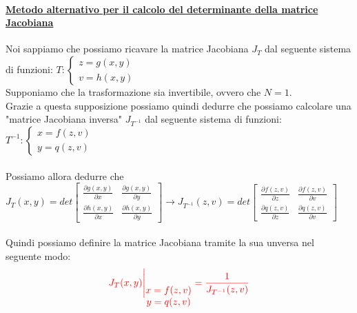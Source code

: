 \documentclass{article}
\begin{document}
\paragraph{\underline{Metodo alternativo per il calcolo del determinante della matrice Jacobiana}}
Noi sappiamo che possiamo ricavare la matrice Jacobiana $J_T$ dal seguente sistema di funzioni: $T:\begin{cases}
    z = g(x,y) \\
    v = h(x,y)
\end{cases}$ \\
Supponiamo che la trasformazione sia invertibile, ovvero che $N = 1$. \\
Grazie a questa supposizione possiamo quindi dedurre che possiamo calcolare una "matrice Jacobiana inversa" $J_{T^{-1}}$ dal seguente sistema di funzioni: $T^{-1}: \begin{cases}
    x = f(z,v) \\
    y = q(z,v)
\end{cases}$ \\ \\
Possiamo allora dedurre che $J_T(x,y) = det \begin{bmatrix}
    \frac{\partial g(x,y)}{\partial x} & \frac{\partial g(x,y)}{\partial y} \\
    \frac{\partial h(x,y)}{\partial x} & \frac{\partial h(x,y)}{\partial y} 
\end{bmatrix} \rightarrow J_{T^{-1}}(z,v) = det \begin{bmatrix}
    \frac{\partial f(z,v)}{\partial z} & \frac{\partial f(z,v)}{\partial v} \\
    \frac{\partial q(z,v)}{\partial z} & \frac{\partial q(z,v)}{\partial v} 
\end{bmatrix}$ \\ \\
Quindi possiamo definire la matrice Jacobiana tramite la sua unversa nel seguente modo:
\[\color{red} J_T(x,y) \Bigg|_{\begin{matrix}
    x = f(z,v) \\
    y = q(z,v)
\end{matrix}} = \frac{1}{J_{T^{-1}}(z,v)}\]
\end{document}
